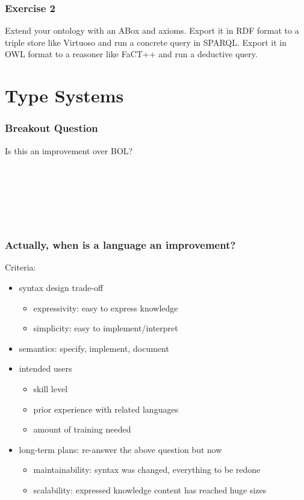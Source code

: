 \begin{frame}\frametitle{Exercise 2}
Extend your ontology with an ABox and axioms.
Export it in RDF format to a triple store like Virtuoso and run a concrete query in SPARQL.
Export it in OWL format to a reasoner like FaCT++ and run a deductive query.
\end{frame}

\section{Type Systems}

\begin{frame}\frametitle{Breakout Question}
Is this an improvement over BOL?
\begin{commgrammar}
\\
\\
\\
\\
\\
\end{commgrammar}
\end{frame}

\begin{frame}\frametitle{Actually, when is a language an improvement?}
Criteria:
\begin{itemize}
\item syntax design trade-off
 \begin{itemize}
  \item expressivity: easy to express knowledge
  \item simplicity: easy to implement/interpret
 \end{itemize}
\item semantics: specify, implement, document
\item intended users
 \begin{itemize}
  \item skill level
  \item prior experience with related languages
  \item amount of training needed
 \end{itemize}
\item long-term plans: re-answer the above question but now
 \begin{itemize}
  \item maintainability: syntax was changed, everything to be redone
  \item scalability: expressed knowledge content has reached huge sizes
 \end{itemize}
\end{itemize}
\end{frame}

